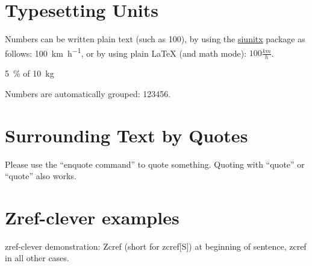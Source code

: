 
\section{Typesetting Units}

\begin{ltgexample}
Numbers can be written plain text (such as 100), by using the \href{https://ctan.org/pkg/siunitx}{siunitx} package as follows:
\SI{100}{\km\per\hour},
or by using plain \LaTeX{} (and math mode):
$100 \frac{\mathit{km}}{h}$.
\end{ltgexample}

\begin{ltgexample}
\SI{5}{\percent} of \SI{10}{kg}
\end{ltgexample}

\begin{ltgexample}
Numbers are automatically grouped: \num{123456}.
\end{ltgexample}

\section{Surrounding Text by Quotes}

\begin{ltgexample}
Please use the \enquote{enquote command} to quote something.
Quoting with "`quote"' or ``quote'' also works.

\end{ltgexample}

\section{Zref-clever examples}
\label{sec:ex:cref}

zref-clever demonstration: Zcref (short for zcref[S]) at beginning of sentence, zcref in all other cases.

